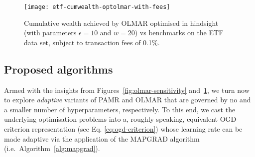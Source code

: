 \begin{figure}[H]
\centering
\texttt{[image: etf-cumwealth-optolmar-with-fees]}
\caption{Cumulative wealth achieved by OLMAR optimised in hindsight (with parameters $\epsilon = 10$ and $w = 20$) vs benchmarks on the ETF data set, subject to transaction fees of 0.1\%.}
\label{fig:optimised-olmar}
\end{figure}

\subsection{Proposed algorithms}

Armed with the insights from Figures~\ref{fig:olmar-sensitivity} and~\ref{fig:optimised-olmar}, we turn now to explore \emph{adaptive} variants of PAMR and OLMAR that are governed by no and a smaller number of hyperparameters, respectively. To this end, we cast the underlying optimisation problems into a, roughly speaking, equivalent OGD-criterion representation (see Eq. \eqref{eq:ogd-criterion}) whose learning rate can be made adaptive via the application of the MAPGRAD algorithm (i.e.\ Algorithm~\ref{alg:mapgrad}).

